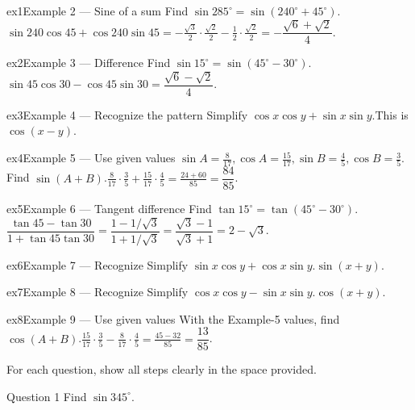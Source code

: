 \documentclass[11pt]{article}
\begin{document}
\begin{example}{ex1}{Example 2 --- Sine of a sum}
Find $\sin 285^\circ=\sin(240^\circ+45^\circ)$.\soln $\sin240\cos45+\cos240\sin45=-\tfrac{\sqrt3}{2}\cdot\tfrac{\sqrt2}{2}-\tfrac12\cdot\tfrac{\sqrt2}{2}=-\dfrac{\sqrt6+\sqrt2}{4}$.
\end{example}

\begin{example}{ex2}{Example 3 --- Difference}
Find $\sin 15^\circ=\sin(45^\circ-30^\circ)$.\soln $\sin45\cos30-\cos45\sin30=\dfrac{\sqrt6-\sqrt2}{4}$.
\end{example}

\begin{example}{ex3}{Example 4 --- Recognize the pattern}
Simplify $\cos x\cos y+\sin x\sin y$.\soln This is $\cos(x-y)$.
\end{example}

\begin{example}{ex4}{Example 5 --- Use given values}
$\sin A=\tfrac8{17},\cos A=\tfrac{15}{17},\sin B=\tfrac45,\cos B=\tfrac35$. Find $\sin(A+B)$.\soln $\tfrac8{17}\cdot\tfrac35+\tfrac{15}{17}\cdot\tfrac45=\tfrac{24+60}{85}=\dfrac{84}{85}$.
\end{example}

\begin{example}{ex5}{Example 6 --- Tangent difference}
Find $\tan 15^\circ=\tan(45^\circ-30^\circ)$.\soln $\dfrac{\tan45-\tan30}{1+\tan45\tan30}=\dfrac{1-1/\sqrt3}{1+1/\sqrt3}=\dfrac{\sqrt3-1}{\sqrt3+1}=2-\sqrt3$.
\end{example}

\begin{example}{ex6}{Example 7 --- Recognize}
Simplify $\sin x\cos y+\cos x\sin y$.\soln $\sin(x+y)$.
\end{example}

\begin{example}{ex7}{Example 8 --- Recognize}
Simplify $\cos x\cos y-\sin x\sin y$.\soln $\cos(x+y)$.
\end{example}

\begin{example}{ex8}{Example 9 --- Use given values}
With the Example-5 values, find $\cos(A+B)$.\soln $\tfrac{15}{17}\cdot\tfrac35-\tfrac8{17}\cdot\tfrac45=\tfrac{45-32}{85}=\dfrac{13}{85}$.
\end{example}

\clearpage
{}
For each question, show all steps clearly in the space provided.

\begin{qbox}{Question 1}
Find $\sin 345^\circ$.\workspace{2.4cm}
\end{qbox}
\end{document}
